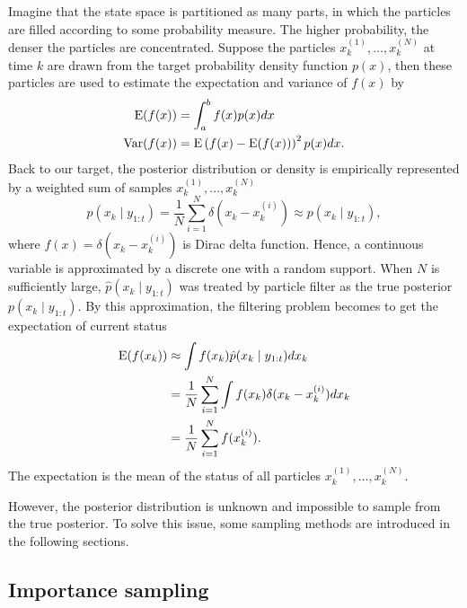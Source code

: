 Imagine that the state space is partitioned as many parts, in which the particles are filled according to some probability measure. The higher probability, the denser the particles are concentrated. Suppose the particles $x_k^{(1)}, \dots, x_k^{(N)}$ at time $k$ are drawn from the target probability density function $p(x)$, then these particles are used to estimate the expectation and variance of $f(x)$ by
\begin{align*}
\mathrm{E}(f(x)) &= \int_a^bf(x)p(x)dx\\
\mathrm{Var}(f(x)) &= \mathrm{E}\left( f(x)-\mathrm{E}(f(x)) \right)^2p(x)dx.
\end{align*}
Back to our target, the posterior distribution or density is empirically represented by a weighted sum of samples $x_k^{(1)}, \dots, x_k^{(N)}$  
\begin{equation}\label{rawParticleFilter}
\hat{p}(x_k\mid y_{1:t})=\frac{1}{N}\sum_{i=1}^N\delta (x_k-x_k^{(i)})\approx p(x_k\mid y_{1:t}),
\end{equation}
where $f(x)=\delta (x_k-x_k^{(i)})$ is Dirac delta function. Hence, a continuous variable is approximated by a discrete one with a random support. When $N$ is sufficiently large, $\hat{p}(x_k\mid y_{1:t})$ was treated by particle filter as the true posterior $p(x_k\mid y_{1:t})$. By this approximation, the filtering problem becomes to get the expectation of current status 
\begin{align*}
\mathrm{E}(f(x_k)) &\approx \int f(x_k)\hat{p}(x_k\mid y_{1:t})dx_k \\
 & =\frac{1}{N} \sum_{i=1}^N\int f(x_k) \delta (x_k-x_k^{(i)}) dx_k\\
 & = \frac{1}{N}\sum_{i=1}^Nf(x_k^{(i)}).
\end{align*}
The expectation is the mean of the status of all particles $x_k^{(1)}, \dots, x_k^{(N)}$.  

However, the posterior distribution is unknown and impossible to sample from the true posterior. To solve this issue, some sampling methods are introduced in the following sections.


\subsection{Importance sampling}

